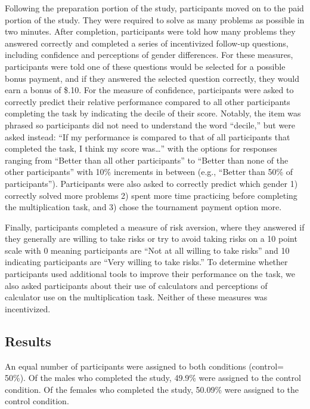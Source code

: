 \documentclass[a4paper, nobind]{templates/ociamthesis}
\begin{document}
Following the preparation portion of the study, participants moved on to the paid portion of the study. They were required to solve as many problems as possible in two minutes. After completion, participants were told how many problems they answered correctly and completed a series of incentivized follow-up questions, including confidence and perceptions of gender differences. For these measures, participants were told one of these questions would be selected for a possible bonus payment, and if they answered the selected question correctly, they would earn a bonus of \$.10. For the measure of confidence, participants were asked to correctly predict their relative performance compared to all other participants completing the task by indicating the decile of their score. Notably, the item was phrased so participants did not need to understand the word ``decile,'' but were asked instead: ``If my performance is compared to that of all participants that completed the task, I think my score was\ldots{}'' with the options for responses ranging from ``Better than all other participants'' to ``Better than none of the other participants'' with 10\% increments in between (e.g., ``Better than 50\% of participants''). Participants were also asked to correctly predict which gender 1) correctly solved more problems 2) spent more time practicing before completing the multiplication task, and 3) chose the tournament payment option more.

Finally, participants completed a measure of risk aversion, where they answered if they generally are willing to take risks or try to avoid taking risks \autocite{Dohmen2011} on a 10 point scale with 0 meaning participants are ``Not at all willing to take risks'' and 10 indicating participants are ``Very willing to take risks.'' To determine whether participants used additional tools to improve their performance on the task, we also asked participants about their use of calculators and perceptions of calculator use on the multiplication task. Neither of these measures was incentivized.

\hypertarget{results}{%
\subsection{Results}\label{results}}

An equal number of participants were assigned to both conditions (control= 50\%). Of the males who completed the study, 49.9\% were assigned to the control condition. Of the females who completed the study, 50.09\% were assigned to the control condition.
\end{document}
